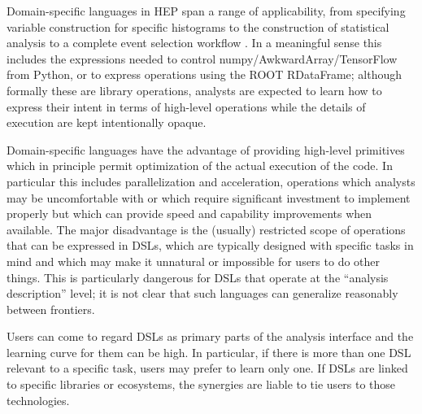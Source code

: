 Domain-specific languages in HEP span a range of applicability, from specifying variable construction for specific histograms to the construction of statistical analysis to a complete event selection workflow \cite{Prosper:2022lnf}. In a meaningful sense this includes the expressions needed to control numpy/AwkwardArray/TensorFlow from Python, or to express operations using the ROOT RDataFrame; although formally these are library operations, analysts are expected to learn how to express their intent in terms of high-level operations while the details of execution are kept intentionally opaque. 

Domain-specific languages have the advantage of providing high-level primitives which in principle permit optimization of the actual execution of the code. In particular this includes parallelization and acceleration, operations which analysts may be uncomfortable with or which require significant investment to implement properly but which can provide speed and capability improvements when available. The major disadvantage is the (usually) restricted scope of operations that can be expressed in DSLs, which are typically designed with specific tasks in mind and which may make it unnatural or impossible for users to do other things. This is particularly dangerous for DSLs that operate at the ``analysis description'' level; it is not clear that such languages can generalize reasonably between frontiers.

Users can come to regard DSLs as primary parts of the analysis interface and the learning curve for them can be high. In particular, if there is more than one DSL relevant to a specific task, users may prefer to learn only one. If DSLs are linked to specific libraries or ecosystems, the synergies are liable to tie users to those technologies. 

